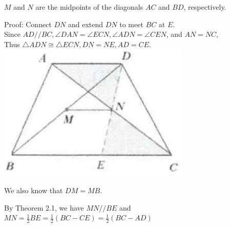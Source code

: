 \documentclass{article}
\begin{document}
\(M\) and \(N\) are the midpoints of the diagonals \(A C\) and \(B D\), respectively.

Proof:
Connect \(D N\) and extend \(D N\) to meet \(B C\) at \(E\).\\
Since \(A D / / B C, \angle D A N=\angle E C N, \angle A D N=\angle C E N\), and \(A N=N C\),\\
Thus \(\triangle A D N \cong \triangle E C N, D N=N E, A D=C E\).\\
\centering
\includegraphics[width=\textwidth]{images/035(3).jpg}

We also know that \(D M=M B\).

By Theorem 2.1, we have \(M N / / B E\) and\\
\(M N=\frac{1}{2} B E=\frac{1}{2}(B C-C E)=\frac{1}{2}(B C-A D)\)\\
\end{document}
